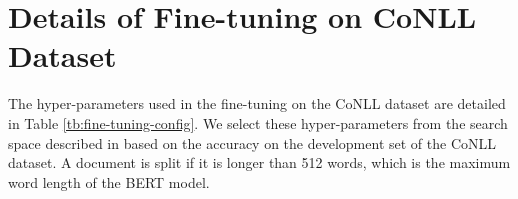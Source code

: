 \documentclass[11pt]{article}
\begin{document}
\begin{table}[t]
  \centering
  \caption{Hyper-parameters used for training on Wikipedia entity annotations.}
  \label{tb:pretraining-config}
  
\end{table}

\section{Details of Fine-tuning on CoNLL Dataset}
\label{sec:fine-tuning-details}
The hyper-parameters used in the fine-tuning on the CoNLL dataset are detailed in Table \ref{tb:fine-tuning-config}.
We select these hyper-parameters from the search space described in  based on the accuracy on the development set of the CoNLL dataset.
A document is split if it is longer than 512 words, which is the maximum word length of the BERT model.
\end{document}
